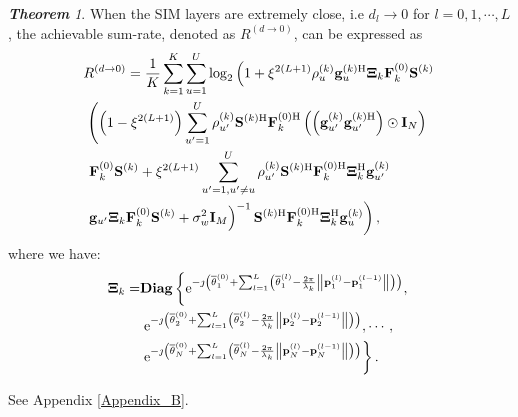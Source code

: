 \documentclass[lettersize,journal]{IEEEtran}
\theoremstyle{remark}
\newtheorem{theorem}{\quad \textbf{Theorem}}
\begin{document}
\begin{theorem}\label{Theorem_3}
When the SIM layers are extremely close, i.e $d_l\rightarrow 0$ for $l=0,1,\cdots,L$, the achievable sum-rate, denoted as $R^{(d\rightarrow 0)}$, can be expressed as
\begin{align}\label{Performance_Analysis_3}
    \notag &R^{(d\rightarrow 0)}=\frac{1}{K}\sum_{k=1}^K\sum_{u=1}^U\log_2
    \left(1+\xi^{2(L+1)}\rho_u^{(k)}\mathbf{g}_u^{(k)\mathrm{H}}
    \mathbf{\Xi}_k\mathbf{F}_k^{(0)}\mathbf{S}^{(k)}\right.\\
    \notag&\left.\left(\left(1-\xi^{2(L+1)}\right)\sum_{u'=1}^{U}\rho_{u'}^{(k)}
    \mathbf{S}^{(k)\mathrm{H}}\mathbf{F}_k^{(0)\mathrm{H}}
    \left(\left(\mathbf{g}_{u'}^{(k)}\mathbf{g}_{u'}^{(k)\mathrm{H}}\right)
    \odot\mathbf{I}_N\right)\right.\right.\\
    \notag&\left.\left.\mathbf{F}_k^{(0)}\mathbf{S}^{(k)}
    +\xi^{2(L+1)}\sum_{u'=1,u'\neq u}^{U}\rho_{u'}^{(k)}
    \mathbf{S}^{(k)\mathrm{H}}\mathbf{F}_k^{(0)\mathrm{H}}
    \mathbf{\mathbf{\Xi}}_k^{\mathrm{H}}\mathbf{g}_{u'}^{(k)}\right.\right.\\
    &\left.\left.\mathbf{g}_{u'}\mathbf{\mathbf{\Xi}}_k\mathbf{F}_k^{(0)}\mathbf{S}^{(k)}
    +\sigma_w^2\mathbf{I}_M\right)^{-1}\mathbf{S}^{(k)\mathrm{H}}\mathbf{F}_k^{(0)\mathrm{H}}
    \mathbf{\mathbf{\Xi}}_k^{\mathrm{H}}\mathbf{g}_u^{(k)}\right),
\end{align}
where we have:
\begin{align}\label{Performance_Analysis_4}
    \notag\mathbf{\Xi}_k=&\mathbf{Diag}
    \left\{\mathrm{e}^{-\jmath \left(\overline{\theta}_1^{(0)}
    +\sum_{l=1}^{L}\left(\overline{\theta}_1^{(l)}-\frac{2\pi}{\lambda_k}\left\|\mathbf{p}_{1}^{(l)}
    -\mathbf{p}_{1}^{(l-1)}\right\|\right)\right)},\right.\\
    \notag&\left.\mathrm{e}^{-\jmath \left(\overline{\theta}_2^{(0)}
    +\sum_{l=1}^{L}\left(\overline{\theta}_2^{(l)}-\frac{2\pi}{\lambda_k}\left\|\mathbf{p}_{2}^{(l)}
    -\mathbf{p}_{2}^{(l-1)}\right\|\right)\right)},\cdots,\right.\\
    &\left.\mathrm{e}^{-\jmath \left(\overline{\theta}_N^{(0)}
    +\sum_{l=1}^{L}\left(\overline{\theta}_N^{(l)}-\frac{2\pi}{\lambda_k}\left\|\mathbf{p}_{N}^{(l)}
    -\mathbf{p}_{N}^{(l-1)}\right\|\right)\right)}\right\}.
\end{align}
\end{theorem}
\begin{IEEEproof}
    See Appendix \ref{Appendix_B}.
\end{IEEEproof}
\end{document}
